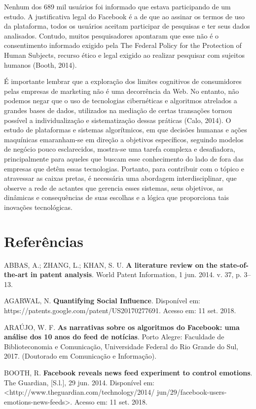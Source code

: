 Nenhum dos 689 mil usuários foi informado que estava participando de um
estudo. A justificativa legal do Facebook é a de que ao assinar os
termos de uso da plataforma, todos os usuários aceitam participar de
pesquisas e ter seus dados analisados. Contudo, muitos pesquisadores
apontaram que esse não é o consentimento informado exigido pela The
Federal Policy for the Protection of Human Subjects, recurso ético e
legal exigido ao realizar pesquisar com sujeitos humanos (Booth, 2014).

É importante lembrar que a exploração dos limites cognitivos de
consumidores pelas empresas de marketing não é uma decorrência da Web.
No entanto, não podemos negar que o uso de tecnologias cibernéticas e
algoritmos atrelados a grandes bases de dados, utilizados na mediação de
certas transações tornou possível a individualização e sistematização
dessas práticas (Calo, 2014). O estudo de plataformas e sistemas
algorítmicos, em que decisões humanas e ações maquínicas emaranham-se em
direção a objetivos específicos, seguindo modelos de negócio pouco
esclarecidos, mostra-se uma tarefa complexa e desafiadora,
principalmente para aqueles que buscam esse conhecimento do lado de fora
das empresas que detêm essas tecnologias. Portanto, para contribuir com
o tópico e atravessar as caixas pretas, é necessária uma abordagem
interdisciplinar, que observe a rede de actantes que gerencia esses
sistemas, seus objetivos, as dinâmicas e consequências de suas escolhas
e a lógica que proporciona tais inovações tecnológicas.

\section{Referências}

ABBAS, A.; ZHANG, L.; KHAN, S. U. \textbf{A literature review on the
state-of-the-art in patent analysis}. World Patent Information, 1 jun.
2014. v. 37, p. 3--13.

AGARWAL, N. \textbf{Quantifying Social Influence}. Disponível em:
https://patents.google.com/patent/US20170277691. Acesso em: 11 set.
2018.

ARAÚJO, W. F. \textbf{As narrativas sobre os algoritmos do Facebook: uma
análise dos 10 anos do feed de notícias}. Porto Alegre: Faculdade de
Biblioteconomia e Comunicação, Universidade Federal do Rio Grande do
Sul, 2017. (Doutorado em Comunicação e Informação).

BOOTH, R. \textbf{Facebook reveals news feed experiment to control
emotions}. The Guardian, {[}S.l.{]}, 29 jun. 2014. Disponível em:
\textless{}http://www.theguardian.com/technology/2014/
jun/29/facebook-users-emotions-news-feeds\textgreater{}.
Acesso em: 11 set. 2018.


